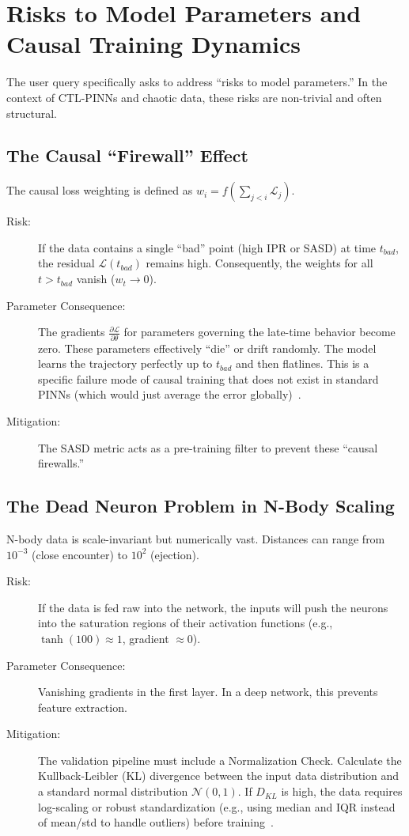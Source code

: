 \section{Risks to Model Parameters and Causal Training Dynamics}

The user query specifically asks to address ``risks to model parameters.'' In the context of CTL-PINNs and chaotic data, these risks are non-trivial and often structural.

\subsection{The Causal ``Firewall'' Effect}

The causal loss weighting is defined as $w_i = f(\sum_{j<i} \mathcal{L}_j)$.
\begin{description}
    \item[Risk:] If the data contains a single ``bad'' point (high IPR or SASD) at time $t_{bad}$, the residual $\mathcal{L}(t_{bad})$ remains high. Consequently, the weights for all $t > t_{bad}$ vanish ($w_t \to 0$).
    \item[Parameter Consequence:] The gradients $\frac{\partial \mathcal{L}}{\partial \theta}$ for parameters governing the late-time behavior become zero. These parameters effectively ``die'' or drift randomly. The model learns the trajectory perfectly up to $t_{bad}$ and then flatlines. This is a specific failure mode of causal training that does not exist in standard PINNs (which would just average the error globally)~\cite{ref10}.
    \item[Mitigation:] The SASD metric acts as a pre-training filter to prevent these ``causal firewalls.''
\end{description}

\subsection{The Dead Neuron Problem in N-Body Scaling}

N-body data is scale-invariant but numerically vast. Distances can range from $10^{-3}$ (close encounter) to $10^2$ (ejection).
\begin{description}
    \item[Risk:] If the data is fed raw into the network, the inputs will push the neurons into the saturation regions of their activation functions (e.g., $\tanh(100) \approx 1$, gradient $\approx 0$).
    \item[Parameter Consequence:] Vanishing gradients in the first layer. In a deep network, this prevents feature extraction.
    \item[Mitigation:] The validation pipeline must include a Normalization Check. Calculate the Kullback-Leibler (KL) divergence between the input data distribution and a standard normal distribution $\mathcal{N}(0, 1)$. If $D_{KL}$ is high, the data requires log-scaling or robust standardization (e.g., using median and IQR instead of mean/std to handle outliers) before training~\cite{ref13}.
\end{description}

